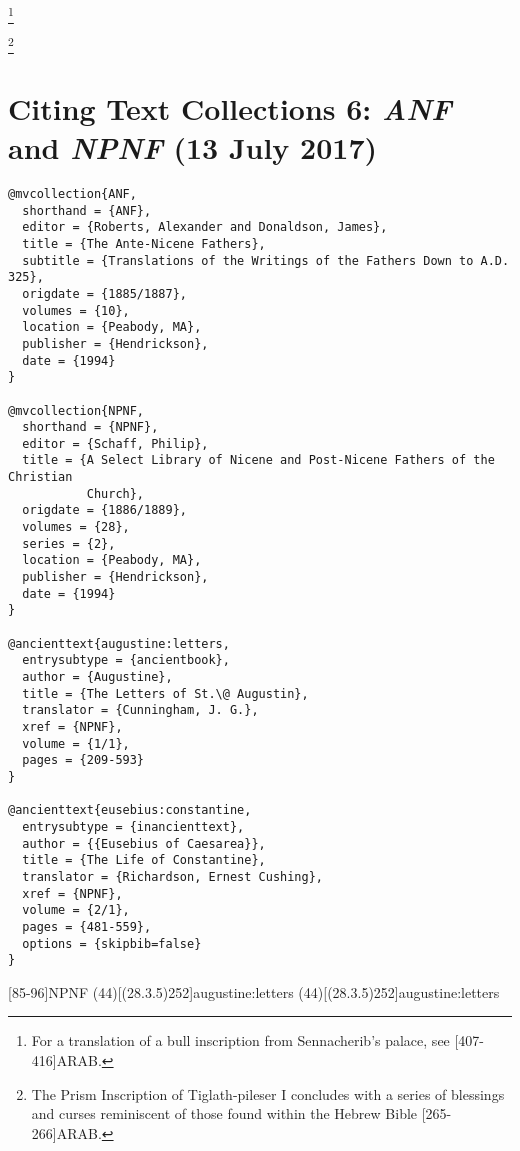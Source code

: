 \documentclass[a4paper]{article}
\begin{document}
\begin{fverbcite}{28}
  \footnote{For a translation of a bull inscription from Sennacherib’s palace,
    see [407-416]{ARAB}.}
\end{fverbcite}
\begin{fverbcite}{5}
  \footnote{The Prism Inscription of Tiglath-pileser I concludes with a series
    of blessings and curses reminiscent of those found within the Hebrew Bible
    [265-266]{ARAB}.}
\end{fverbcite}
\exampleabbreviations
{}

\section{Citing Text Collections 6: \emph{ANF} and \emph{NPNF} (13 July 2017)}

\begin{verbatim}
@mvcollection{ANF,
  shorthand = {ANF},
  editor = {Roberts, Alexander and Donaldson, James},
  title = {The Ante-Nicene Fathers},
  subtitle = {Translations of the Writings of the Fathers Down to A.D. 325},
  origdate = {1885/1887},
  volumes = {10},
  location = {Peabody, MA},
  publisher = {Hendrickson},
  date = {1994}
}

@mvcollection{NPNF,
  shorthand = {NPNF},
  editor = {Schaff, Philip},
  title = {A Select Library of Nicene and Post-Nicene Fathers of the Christian
           Church},
  origdate = {1886/1889},
  volumes = {28},
  series = {2},
  location = {Peabody, MA},
  publisher = {Hendrickson},
  date = {1994}
}

@ancienttext{augustine:letters,
  entrysubtype = {ancientbook},
  author = {Augustine},
  title = {The Letters of St.\@ Augustin},
  translator = {Cunningham, J. G.},
  xref = {NPNF},
  volume = {1/1},
  pages = {209-593}
}

@ancienttext{eusebius:constantine,
  entrysubtype = {inancienttext},
  author = {{Eusebius of Caesarea}},
  title = {The Life of Constantine},
  translator = {Richardson, Ernest Cushing},
  xref = {NPNF},
  volume = {2/1},
  pages = {481-559},
  options = {skipbib=false}
}
\end{verbatim}

[85-96]{NPNF}
\examplecite(44)[(28.3.5)252]{augustine:letters}
\examplecite[atrans](44)[(28.3.5)252]{augustine:letters}
\begin{verbcite}
  \nocite{ANF, eusebius:constantine}
\end{verbcite}
\exampleabbreviations
\examplebibliography
{}
\end{document}
